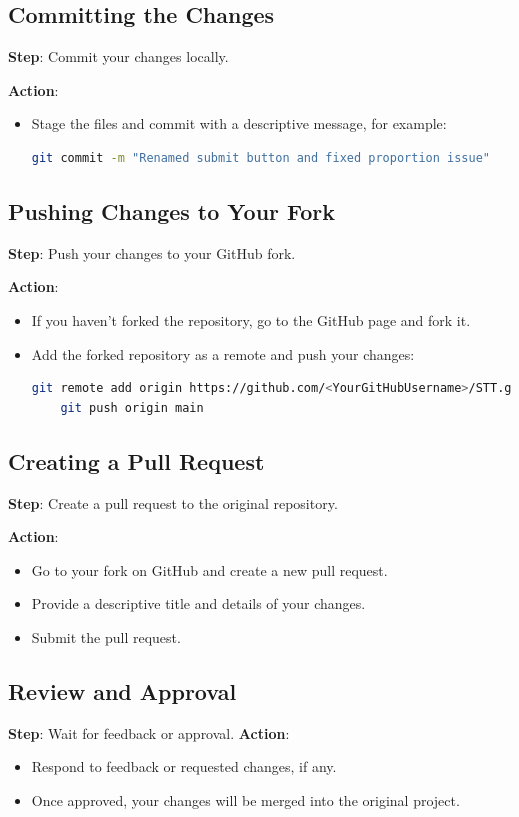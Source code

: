 \documentclass{article}
\begin{document}
\subsection{Committing the Changes}
\textbf{Step}: Commit your changes locally.

\textbf{Action}:
\begin{itemize}
    \item Stage the files and commit with a descriptive message, for example:
    \begin{lstlisting}[language=bash]
    git commit -m "Renamed submit button and fixed proportion issue"
    \end{lstlisting}
\end{itemize}

\subsection{Pushing Changes to Your Fork}
\textbf{Step}: Push your changes to your GitHub fork.

\textbf{Action}:
\begin{itemize}
    \item If you haven’t forked the repository, go to the GitHub page and fork it.
    \item Add the forked repository as a remote and push your changes:
    \begin{lstlisting}[language=bash]
    git remote add origin https://github.com/<YourGitHubUsername>/STT.git
    git push origin main
    \end{lstlisting}
\end{itemize}

\subsection{Creating a Pull Request}
\textbf{Step}: Create a pull request to the original repository.

\textbf{Action}:
\begin{itemize}
    \item Go to your fork on GitHub and create a new pull request.
    \item Provide a descriptive title and details of your changes.
    \item Submit the pull request.
\end{itemize}

\subsection{Review and Approval}
\textbf{Step}: Wait for feedback or approval.
\textbf{Action}:
\begin{itemize}
    \item Respond to feedback or requested changes, if any.
    \item Once approved, your changes will be merged into the original project.
\end{itemize}
\vspace{20in}
\end{document}
